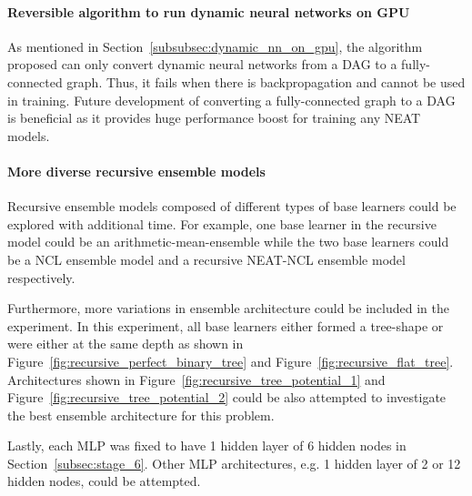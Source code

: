 \paragraph{Reversible algorithm to run dynamic neural networks on GPU}
As mentioned in Section~\ref{subsubsec:dynamic_nn_on_gpu}, the algorithm proposed can only convert dynamic neural networks from a DAG to a fully-connected graph. Thus, it fails when there is backpropagation and cannot be used in training. Future development of converting a fully-connected graph to a DAG is beneficial as it provides huge performance boost for training any NEAT models. 

\paragraph{More diverse recursive ensemble models}
Recursive ensemble models composed of different types of base learners could be explored with additional time. For example, one base learner in the recursive model could be an arithmetic-mean-ensemble while the two base learners could be a NCL ensemble model and a recursive NEAT-NCL ensemble model respectively. 

Furthermore, more variations in ensemble architecture could be included in the experiment. In this experiment, all base learners either formed a tree-shape or were either at the same depth as shown in Figure~\ref{fig:recursive_perfect_binary_tree} and Figure~\ref{fig:recursive_flat_tree}. Architectures shown in Figure~\ref{fig:recursive_tree_potential_1} and Figure~\ref{fig:recursive_tree_potential_2} could be also attempted to investigate the best ensemble architecture for this problem. 

Lastly, each MLP was fixed to have 1 hidden layer of 6 hidden nodes in Section~\ref{subsec:stage_6}. Other MLP architectures, e.g. 1 hidden layer of 2 or 12 hidden nodes, could be attempted. 

